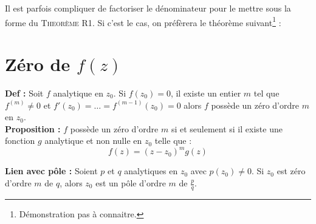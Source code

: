 Il est parfois compliquer de factoriser le dénominateur pour le mettre sous la forme
du \textsc{Theorème R1}. Si c'est le cas, on préfèrera le théorème suivant\footnote{
	Démonstration pas à connaitre.} :\\
	

\section{Zéro de $f(z)$}
\textbf{Def :} Soit $f$ analytique en $z_0$. Si $f(z_0) = 0$, il existe un entier $m$ tel que
$f^{(m)}\neq 0$ et $f'(z_0) = \dots = f^{(m-1)}(z_0) = 0$ alors $f$ possède un 
zéro d'ordre $m$ en $z_0$.\\

\textbf{Proposition :} $f$ possède un zéro d'ordre $m$ si et seulement si il existe une fonction $g$ analytique et non nulle en $z_0$ telle que :
\begin{equation}
	f(z) = (z-z_0)^mg(z)
\end{equation}

\textbf{Lien avec pôle :} Soient $p$ et $q$ analytiques en $z_0$ avec $p(z_0)\neq 0$. Si
$z_0$ est zéro d'ordre $m$ de $q$, alors $z_0$ est un pôle d'ordre $m$ de $\frac{p}{q}$.

